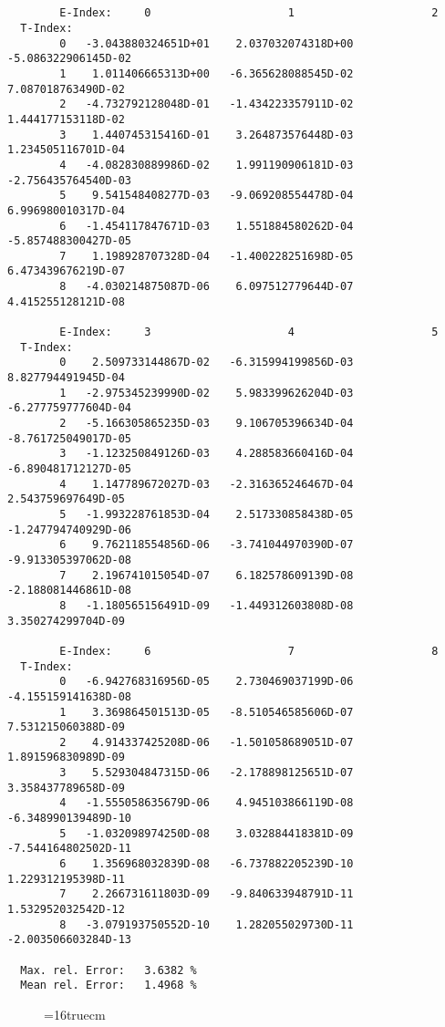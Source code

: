 \documentclass[12pt]{article}
\begin{document}
\begin{small}\begin{verbatim}


        E-Index:     0                     1                     2
  T-Index:
        0   -3.043880324651D+01    2.037032074318D+00   -5.086322906145D-02
        1    1.011406665313D+00   -6.365628088545D-02    7.087018763490D-02
        2   -4.732792128048D-01   -1.434223357911D-02    1.444177153118D-02
        3    1.440745315416D-01    3.264873576448D-03    1.234505116701D-04
        4   -4.082830889986D-02    1.991190906181D-03   -2.756435764540D-03
        5    9.541548408277D-03   -9.069208554478D-04    6.996980010317D-04
        6   -1.454117847671D-03    1.551884580262D-04   -5.857488300427D-05
        7    1.198928707328D-04   -1.400228251698D-05    6.473439676219D-07
        8   -4.030214875087D-06    6.097512779644D-07    4.415255128121D-08

        E-Index:     3                     4                     5
  T-Index:
        0    2.509733144867D-02   -6.315994199856D-03    8.827794491945D-04
        1   -2.975345239990D-02    5.983399626204D-03   -6.277759777604D-04
        2   -5.166305865235D-03    9.106705396634D-04   -8.761725049017D-05
        3   -1.123250849126D-03    4.288583660416D-04   -6.890481712127D-05
        4    1.147789672027D-03   -2.316365246467D-04    2.543759697649D-05
        5   -1.993228761853D-04    2.517330858438D-05   -1.247794740929D-06
        6    9.762118554856D-06   -3.741044970390D-07   -9.913305397062D-08
        7    2.196741015054D-07    6.182578609139D-08   -2.188081446861D-08
        8   -1.180565156491D-09   -1.449312603808D-08    3.350274299704D-09

        E-Index:     6                     7                     8
  T-Index:
        0   -6.942768316956D-05    2.730469037199D-06   -4.155159141638D-08
        1    3.369864501513D-05   -8.510546585606D-07    7.531215060388D-09
        2    4.914337425208D-06   -1.501058689051D-07    1.891596830989D-09
        3    5.529304847315D-06   -2.178898125651D-07    3.358437789658D-09
        4   -1.555058635679D-06    4.945103866119D-08   -6.348990139489D-10
        5   -1.032098974250D-08    3.032884418381D-09   -7.544164802502D-11
        6    1.356968032839D-08   -6.737882205239D-10    1.229312195398D-11
        7    2.266731611803D-09   -9.840633948791D-11    1.532952032542D-12
        8   -3.079193750552D-10    1.282055029730D-11   -2.003506603284D-13

  Max. rel. Error:   3.6382 %
  Mean rel. Error:   1.4968 %

\end{verbatim}\end{small}
\begin{figure} \label{7.2d}
\epsfxsize=16truecm
\end{figure}
\newpage
\end{document}
